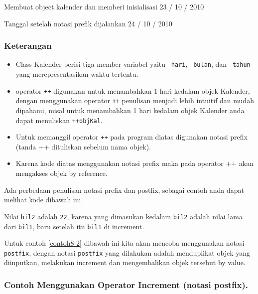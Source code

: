 \begin{lcverbatim}
Membuat object kalender dan memberi inisialisasi
23 / 10 / 2010

Tanggal setelah notasi prefik dijalankan
24 / 10 / 2010
\end{lcverbatim}

\subsubsection*{Keterangan}

\begin{itemize}

\item
  Class Kalender berisi tiga member variabel yaitu \texttt{\_hari},
  \texttt{\_bulan}, dan \texttt{\_tahun} yang merepresentasikan waktu
  tertentu.
\item
  operator \texttt{++} digunakan untuk menambahkan 1 hari kedalam objek
  Kalender, dengan menggunakan operator \texttt{++} penulisan menjadi
  lebih intuitif dan mudah dipahami, misal untuk menambahkan 1 hari
  kedalam objek Kalender anda dapat menuliskan \texttt{++objKal}.
\item
  Untuk memanggil operator \texttt{++} pada program diatas digunakan
  notasi prefix (tanda ++ dituliskan sebelum nama objek).
\item
  Karena kode diatas menggunakan notasi prefix maka pada operator ++
  akan mengakses objek by reference.
\end{itemize}

Ada perbedaan penulisan notasi prefix dan postfix, sebagai contoh anda
dapat melihat kode dibawah ini.



Nilai \texttt{bil2} adalah \texttt{22}, karena yang dimasukan kedalam
\texttt{bil2} adalah nilai lama dari \texttt{bil1}, baru setelah itu
\texttt{bil1} di increment.

Untuk contoh \ref{contoh8-2} dibawah ini kita akan mencoba menggunakan notasi
\texttt{postfix}, dengan notasi \texttt{postfix} yang dilakukan adalah
menduplikat objek yang diinputkan, melakukan increment dan mengembalikan
objek tersebut by value.

\subsubsection*{Contoh  Menggunakan Operator Increment (notasi postfix).}

